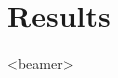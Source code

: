 \section{Results}
\begin{frame}<beamer>



\vspace*{1.5cm}
\begin{figure}
\centering

\end{figure}
\end{frame}
